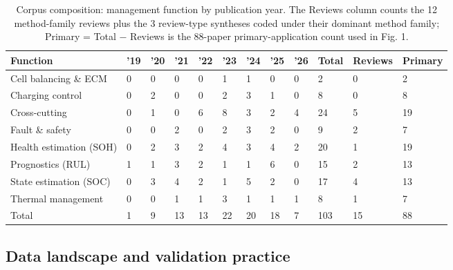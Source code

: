 \documentclass[journal]{IEEEtran}
\begin{document}
\begin{table}[!t]
\caption{Corpus composition: management function by publication year. The Reviews column counts the 12 method-family reviews plus the 3 review-type syntheses coded under their dominant method family; Primary = Total $-$ Reviews is the 88-paper primary-application count used in Fig. 1.}
\label{tab:TABLE2}
\centering
\footnotesize
\begin{tabular}{|p{1.64in}|p{0.32in}|p{0.32in}|p{0.32in}|p{0.32in}|p{0.32in}|p{0.32in}|p{0.32in}|p{0.32in}|p{0.36in}|p{0.50in}|p{0.50in}|}
\hline
\textbf{Function} & \textbf{'19} & \textbf{'20} & \textbf{'21} & \textbf{'22} & \textbf{'23} & \textbf{'24} & \textbf{'25} & \textbf{'26} & \textbf{Total} & \textbf{Reviews} & \textbf{Primary} \\
\hline
Cell balancing \& ECM & 0 & 0 & 0 & 0 & 1 & 1 & 0 & 0 & 2 & 0 & 2 \\
Charging control & 0 & 2 & 0 & 0 & 2 & 3 & 1 & 0 & 8 & 0 & 8 \\
Cross-cutting & 0 & 1 & 0 & 6 & 8 & 3 & 2 & 4 & 24 & 5 & 19 \\
Fault \& safety & 0 & 0 & 2 & 0 & 2 & 3 & 2 & 0 & 9 & 2 & 7 \\
Health estimation (SOH) & 0 & 2 & 3 & 2 & 4 & 3 & 4 & 2 & 20 & 1 & 19 \\
Prognostics (RUL) & 1 & 1 & 3 & 2 & 1 & 1 & 6 & 0 & 15 & 2 & 13 \\
State estimation (SOC) & 0 & 3 & 4 & 2 & 1 & 5 & 2 & 0 & 17 & 4 & 13 \\
Thermal management & 0 & 0 & 1 & 1 & 3 & 1 & 1 & 1 & 8 & 1 & 7 \\
Total & 1 & 9 & 13 & 13 & 22 & 20 & 18 & 7 & 103 & 15 & 88 \\
\hline
\hline
\end{tabular}
\end{table}

\subsection{Data landscape and validation practice}
\end{document}
